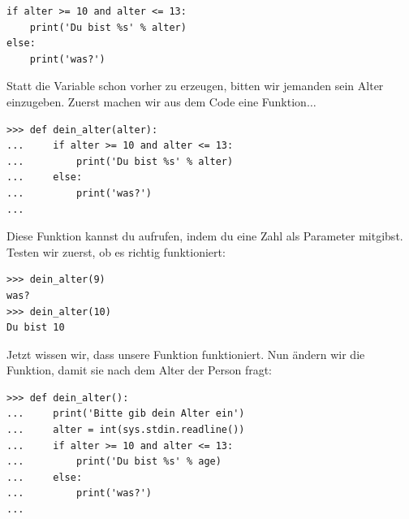 \begin{Verbatim}[frame=single]
if alter >= 10 and alter <= 13:
    print('Du bist %s' % alter)
else:
    print('was?')
\end{Verbatim}

Statt die Variable  schon vorher zu erzeugen, bitten wir jemanden sein Alter einzugeben. Zuerst machen wir aus dem Code eine Funktion$\ldots$

\begin{Verbatim}[frame=single]
>>> def dein_alter(alter):
...     if alter >= 10 and alter <= 13:
...         print('Du bist %s' % alter)
...     else:
...         print('was?')
...
\end{Verbatim}

Diese Funktion kannst du aufrufen, indem du eine Zahl als Parameter mitgibst. Testen wir zuerst, ob es richtig funktioniert:

\begin{Verbatim}[frame=single]
>>> dein_alter(9)
was?
>>> dein_alter(10)
Du bist 10
\end{Verbatim}

Jetzt wissen wir, dass unsere Funktion funktioniert. Nun ändern wir die Funktion, damit sie nach dem Alter der Person fragt:

\begin{Verbatim}[frame=single]
>>> def dein_alter():
...     print('Bitte gib dein Alter ein')
...     alter = int(sys.stdin.readline())
...     if alter >= 10 and alter <= 13:
...         print('Du bist %s' % age)
...     else:
...         print('was?')
...
\end{Verbatim}


